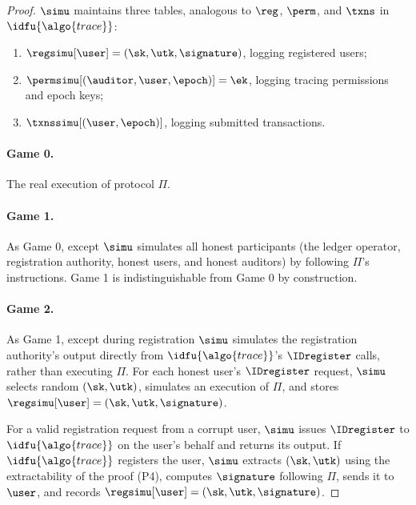 \begin{proof}

  $\simu$ maintains three tables, analogous to $\reg$, $\perm$, and $\txns$ in
  $\idfu{\algo{trace}}$:

  \begin{enumerate}

    \item $\regsimu[\user] = (\sk, \utk, \signature)$, logging registered
      users;

    \item $\permsimu[(\auditor,\user,\epoch)] = \ek$, logging tracing
      permissions and epoch keys;

    \item $\txnssimu[(\user,\epoch)]$, logging submitted transactions.

  \end{enumerate}

  \paragraph{Game 0.} The real execution of protocol $\Pi$.

  \paragraph{Game 1.} As Game 0, except $\simu$ simulates all honest
  participants (the ledger operator, registration authority, honest users, and
  honest auditors) by following $\Pi$'s instructions. Game 1 is
  indistinguishable from Game 0 by construction.

  \paragraph{Game 2.} As Game 1, except during registration $\simu$ simulates
  the registration authority's output directly from $\idfu{\algo{trace}}$'s
  $\IDregister$ calls, rather than executing $\Pi$. For each honest user's
  $\IDregister$ request, $\simu$ selects random $(\sk, \utk)$, simulates an
  execution of $\Pi$, and stores $\regsimu[\user] = (\sk, \utk, \signature)$.

  For a valid registration request from a corrupt user, $\simu$ issues
  $\IDregister$ to $\idfu{\algo{trace}}$ on the user's behalf and returns its
  output.  If $\idfu{\algo{trace}}$ registers the user, $\simu$ extracts $(\sk,
  \utk)$ using the extractability of the proof (P4), computes $\signature$ following
  $\Pi$, sends it to $\user$, and records $\regsimu[\user] = (\sk, \utk,
  \signature)$.


\end{proof}
